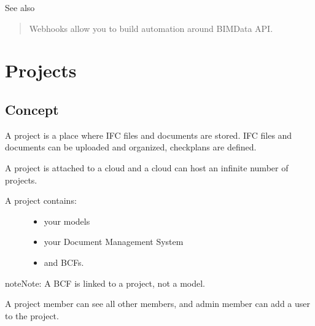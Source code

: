 \documentclass[a4paper,12pt,english]{sphinxmanual}
\begin{document}


See also {\hyperref[\detokenize{guide/webhooks::doc}]{}}
\begin{quote}

Webhooks allow you to build automation around BIMData API.
\end{quote}



\ignorespaces 

\section{Projects}
\label{\detokenize{concepts/projects:projects}}\label{\detokenize{concepts/projects:index-0}}\label{\detokenize{concepts/projects::doc}}

\subsection{Concept}
\label{\detokenize{concepts/projects:concept}}
A project is a place where IFC files and documents are stored. IFC files and documents can be uploaded and organized, checkplans are defined.

A project is attached to a cloud and a cloud can host an infinite number of projects.
\begin{description}
\item[{A project contains:}] \leavevmode\begin{itemize}
\item {} 
your models

\item {} 
your Document Management System

\item {} 
and BCFs.

\end{itemize}

\end{description}

\begin{sphinxadmonition}{note}{Note:}
A BCF is linked to a project, not a model.
\end{sphinxadmonition}

A project member can see all other members, and admin member can add a user to the project.
\end{document}
